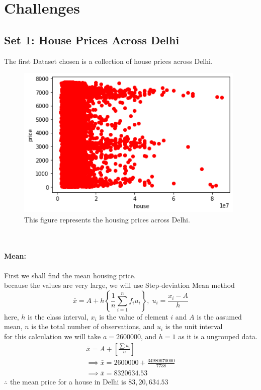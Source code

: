 \documentclass[12pt]{article}
\begin{document}
\section{\Huge{Challenges}}
\subsection{Set 1: House Prices Across Delhi}
The first Dataset chosen is a collection of house prices across Delhi.
\\
\begin{figure}[h]
\includegraphics[width=11cm]{housing_prices_in_delhi.png}
\centering
\caption{This figure represents the housing prices across Delhi.}
\end{figure}
\\
\paragraph{Mean: }
First we shall find the mean housing price. \\
because the values are very large, we will use Step-deviation Mean method \\
\begin{equation}
\bar{x} = A + h \left\{ \frac{1}{n} \sum_{i=1}^nf_iu_i\right\}, \; u_i = \frac{x_i - A}{h}
 \end{equation}
here, $h$ is the class interval, $x_i$ is the value of element $i$ and $A$ is the assumed mean, $n$ is the total number of observations, and $u_i$ is the unit interval \\
for this calculation we will take $a = 2600000$, and $h = 1$ as it is a ungrouped data.
\begin{equation}
\begin{aligned}
\bar{x} = A + \left[\frac{\sum u_i}{n}\right] \\ \implies \bar{x} = 2600000 + \frac{34980670000}{7738} \\ \implies \bar{x} = 8320634.53
\end{aligned}
\end{equation}
$\therefore$ the mean price for a house in Delhi is \rupee $83,20,634.53$
\end{document}
